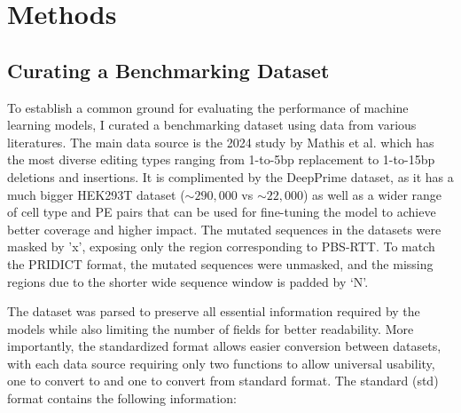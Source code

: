 \chapter{Methods}

\section{Curating a Benchmarking Dataset}

To establish a common ground for evaluating the performance of machine learning models, I curated a benchmarking dataset using data from various literatures. The main data source is the 2024 study by Mathis et al. which has the most diverse editing types ranging from 1-to-5bp replacement to 1-to-15bp deletions and insertions\cite{mathisMachineLearningPrediction2024}. It is complimented by the DeepPrime dataset, as it has a much bigger HEK293T dataset ($\sim290,000$ vs $\sim22,000$) as well as a wider range of cell type and PE pairs that can be used for fine-tuning the model to achieve better coverage and higher impact\cite{yuPredictionEfficienciesDiverse2023}. The mutated sequences in the datasets were masked by 'x', exposing only the region corresponding to PBS-RTT. To match the PRIDICT format, the mutated sequences were unmasked, and the missing regions due to the shorter wide sequence window is padded by `N'.


The dataset was parsed to preserve all essential information required by the models while also limiting the number of fields for better readability. More importantly, the standardized format allows easier conversion between datasets, with each data source requiring only two functions to allow universal usability, one to convert to and one to convert from standard format. The standard (std) format contains the following information:

